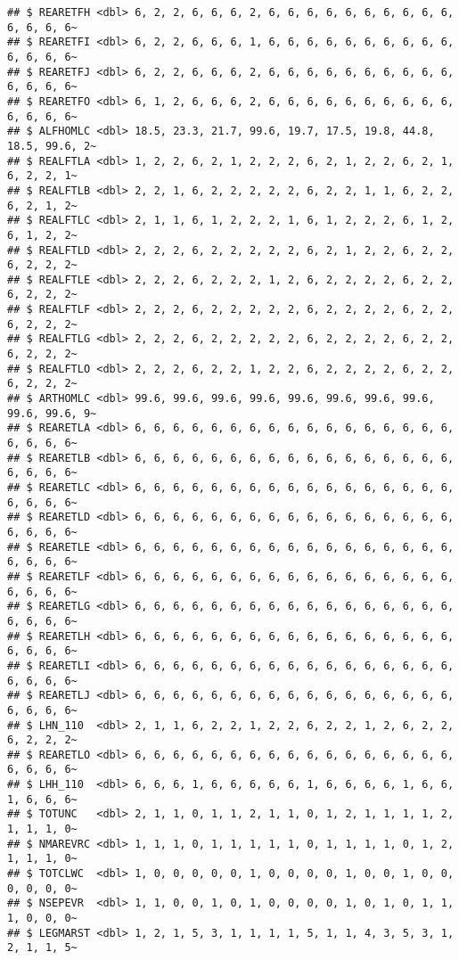 \documentclass[
]{article}
\begin{document}
\begin{verbatim}
## $ REARETFH <dbl> 6, 2, 2, 6, 6, 6, 2, 6, 6, 6, 6, 6, 6, 6, 6, 6, 6, 6, 6, 6, 6~
## $ REARETFI <dbl> 6, 2, 2, 6, 6, 6, 1, 6, 6, 6, 6, 6, 6, 6, 6, 6, 6, 6, 6, 6, 6~
## $ REARETFJ <dbl> 6, 2, 2, 6, 6, 6, 2, 6, 6, 6, 6, 6, 6, 6, 6, 6, 6, 6, 6, 6, 6~
## $ REARETFO <dbl> 6, 1, 2, 6, 6, 6, 2, 6, 6, 6, 6, 6, 6, 6, 6, 6, 6, 6, 6, 6, 6~
## $ ALFHOMLC <dbl> 18.5, 23.3, 21.7, 99.6, 19.7, 17.5, 19.8, 44.8, 18.5, 99.6, 2~
## $ REALFTLA <dbl> 1, 2, 2, 6, 2, 1, 2, 2, 2, 6, 2, 1, 2, 2, 6, 2, 1, 6, 2, 2, 1~
## $ REALFTLB <dbl> 2, 2, 1, 6, 2, 2, 2, 2, 2, 6, 2, 2, 1, 1, 6, 2, 2, 6, 2, 1, 2~
## $ REALFTLC <dbl> 2, 1, 1, 6, 1, 2, 2, 2, 1, 6, 1, 2, 2, 2, 6, 1, 2, 6, 1, 2, 2~
## $ REALFTLD <dbl> 2, 2, 2, 6, 2, 2, 2, 2, 2, 6, 2, 1, 2, 2, 6, 2, 2, 6, 2, 2, 2~
## $ REALFTLE <dbl> 2, 2, 2, 6, 2, 2, 2, 1, 2, 6, 2, 2, 2, 2, 6, 2, 2, 6, 2, 2, 2~
## $ REALFTLF <dbl> 2, 2, 2, 6, 2, 2, 2, 2, 2, 6, 2, 2, 2, 2, 6, 2, 2, 6, 2, 2, 2~
## $ REALFTLG <dbl> 2, 2, 2, 6, 2, 2, 2, 2, 2, 6, 2, 2, 2, 2, 6, 2, 2, 6, 2, 2, 2~
## $ REALFTLO <dbl> 2, 2, 2, 6, 2, 2, 1, 2, 2, 6, 2, 2, 2, 2, 6, 2, 2, 6, 2, 2, 2~
## $ ARTHOMLC <dbl> 99.6, 99.6, 99.6, 99.6, 99.6, 99.6, 99.6, 99.6, 99.6, 99.6, 9~
## $ REARETLA <dbl> 6, 6, 6, 6, 6, 6, 6, 6, 6, 6, 6, 6, 6, 6, 6, 6, 6, 6, 6, 6, 6~
## $ REARETLB <dbl> 6, 6, 6, 6, 6, 6, 6, 6, 6, 6, 6, 6, 6, 6, 6, 6, 6, 6, 6, 6, 6~
## $ REARETLC <dbl> 6, 6, 6, 6, 6, 6, 6, 6, 6, 6, 6, 6, 6, 6, 6, 6, 6, 6, 6, 6, 6~
## $ REARETLD <dbl> 6, 6, 6, 6, 6, 6, 6, 6, 6, 6, 6, 6, 6, 6, 6, 6, 6, 6, 6, 6, 6~
## $ REARETLE <dbl> 6, 6, 6, 6, 6, 6, 6, 6, 6, 6, 6, 6, 6, 6, 6, 6, 6, 6, 6, 6, 6~
## $ REARETLF <dbl> 6, 6, 6, 6, 6, 6, 6, 6, 6, 6, 6, 6, 6, 6, 6, 6, 6, 6, 6, 6, 6~
## $ REARETLG <dbl> 6, 6, 6, 6, 6, 6, 6, 6, 6, 6, 6, 6, 6, 6, 6, 6, 6, 6, 6, 6, 6~
## $ REARETLH <dbl> 6, 6, 6, 6, 6, 6, 6, 6, 6, 6, 6, 6, 6, 6, 6, 6, 6, 6, 6, 6, 6~
## $ REARETLI <dbl> 6, 6, 6, 6, 6, 6, 6, 6, 6, 6, 6, 6, 6, 6, 6, 6, 6, 6, 6, 6, 6~
## $ REARETLJ <dbl> 6, 6, 6, 6, 6, 6, 6, 6, 6, 6, 6, 6, 6, 6, 6, 6, 6, 6, 6, 6, 6~
## $ LHN_110  <dbl> 2, 1, 1, 6, 2, 2, 1, 2, 2, 6, 2, 2, 1, 2, 6, 2, 2, 6, 2, 2, 2~
## $ REARETLO <dbl> 6, 6, 6, 6, 6, 6, 6, 6, 6, 6, 6, 6, 6, 6, 6, 6, 6, 6, 6, 6, 6~
## $ LHH_110  <dbl> 6, 6, 6, 1, 6, 6, 6, 6, 6, 1, 6, 6, 6, 6, 1, 6, 6, 1, 6, 6, 6~
## $ TOTUNC   <dbl> 2, 1, 1, 0, 1, 1, 2, 1, 1, 0, 1, 2, 1, 1, 1, 1, 2, 1, 1, 1, 0~
## $ NMAREVRC <dbl> 1, 1, 1, 0, 1, 1, 1, 1, 1, 0, 1, 1, 1, 1, 0, 1, 2, 1, 1, 1, 0~
## $ TOTCLWC  <dbl> 1, 0, 0, 0, 0, 0, 1, 0, 0, 0, 0, 1, 0, 0, 1, 0, 0, 0, 0, 0, 0~
## $ NSEPEVR  <dbl> 1, 1, 0, 0, 1, 0, 1, 0, 0, 0, 0, 1, 0, 1, 0, 1, 1, 1, 0, 0, 0~
## $ LEGMARST <dbl> 1, 2, 1, 5, 3, 1, 1, 1, 1, 5, 1, 1, 4, 3, 5, 3, 1, 2, 1, 1, 5~

\end{verbatim}
\end{document}

